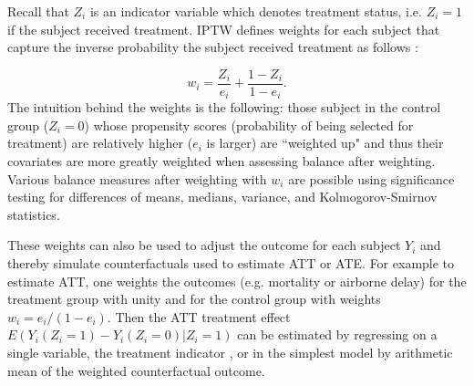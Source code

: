 {Recall that $Z_i$ is an indicator variable which denotes treatment status, i.e. $Z_i=1$ if the subject received treatment.  IPTW defines weights for each subject that capture the inverse probability the subject received treatment as follows \cite{austin2011introduction}:

\begin{equation}
w_i = \frac{Z_i}{e_i} + \frac{1-Z_i}{1-e_i}.
\end{equation}
The intuition behind the weights is the following: those subject in the control group ($Z_i=0$) whose propensity scores (probability of being selected for treatment) are relatively higher ($e_i$ is  larger) are ``weighted up" and thus their covariates are more greatly weighted when assessing balance after weighting.  Various balance measures after weighting with $w_i$ are possible using significance testing for differences of means, medians, variance, and Kolmogorov-Smirnov statistics\cite{ridgeway2015toolkit}.   

These weights can also be used to adjust the outcome for each subject $Y_i$ and thereby simulate counterfactuals used to estimate ATT or ATE.  For example to estimate ATT, one weights the outcomes (e.g. mortality or airborne delay) for the treatment group with unity and for the control group with weights $w_i=e_i/(1-e_i)$.  Then the ATT treatment effect $E(Y_i(Z_i=1)-Y_i(Z_i=0)|Z_i=1)$ can be estimated by regressing on a single variable, the treatment indicator \cite{ridgeway2015toolkit}, or in the simplest model by arithmetic mean of the weighted counterfactual outcome.  


}
